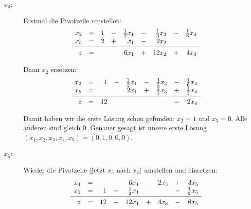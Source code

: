 \documentclass[
a4paper, %
11pt,
]
{scrartcl}
\begin{document}
\begin{description}
  \item[$x_4$:] Erstmal die Pivotzeile umstellen:
    \def\arraystretch{1.5}
    \begin{align*}
      \begin{array}{rcrcrcrcr}
        x_2      & = & 1 & - & \frac{1}{2} x_1 & - & \frac{1}{3} x_3 & - & \frac{1}{6} x_4\\
        x_5      & = & 2 & + & x_1             & - & 2 x_2\\
        \midrule
        z        & = &   &   & 6 x_1           & + & 12 x_2          & + & 4 x_3
      \end{array}
    \end{align*}

    Dann $x_2$ ersetzen:
    \def\arraystretch{1.5}
    \begin{align*}
      \begin{array}{rcrcrcrcr}
        x_2      & = & 1  & - & \frac{1}{2} x_1 & - & \frac{1}{3} x_3 & - & \frac{1}{6} x_4\\
        x_5      & = &    &   & 2 x_1           & + & \frac{2}{3} x_3 & + & \frac{1}{3} x_4\\
        \midrule
        z        & = & 12 &   &                 &   &                 & - & 2 x_4
      \end{array}
    \end{align*}

    Damit haben wir die erste Lösung schon gefunden: $x_2 = 1$ und $x_5 = 0$.
    Alle anderen sind gleich $0$.
    Genauer gesagt ist unsere erste Lösung
    $(x_1, x_2, x_3, x_4, x_5) = (0, 1, 0, 0, 0)$.

  \item[$x_5$:] Wieder die Pivotzeile (jetzt $x_5$ nach $x_2$) umstellen und
    einsetzen:
    \begin{align*}
      \begin{array}{rcrcrcrcr}
        x_4      & = &    & - & 6 x_1           & - & 2 x_3 & + & 3 x_5\\
        x_2      & = & 1  & + & \frac{1}{2} x_1 &   &       & - & \frac{1}{2} x_5\\
        \midrule
        z        & = & 12 & + & 12 x_1          & + & 4 x_3 & - & 6 x_5
      \end{array}
    \end{align*}


\end{description}
\end{document}
